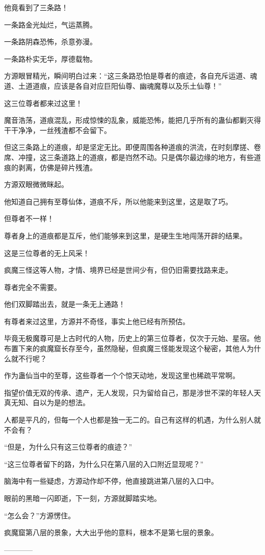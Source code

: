 \begin{this_body}
他竟看到了三条路！

一条路金光灿烂，气运蒸腾。

一条路阴森恐怖，杀意弥漫。

一条路朴实无华，厚德载物。

方源眼冒精光，瞬间明白过来：“这三条路恐怕是尊者的痕迹，各自充斥运道、魂道、土道道痕，应该是各自对应巨阳仙尊、幽魂魔尊以及乐土仙尊！”

这三位尊者都来过这里！

魔音浩荡，道痕混乱，形成惊悚的乱象，威能恐怖，能把几乎所有的蛊仙都剿灭得干干净净，一丝残渣都不会留下。

但这三条路上的道痕，却是坚定无比。即便周围各种道痕的洪流，在时刻摩搓、卷席、冲撞，这三条道路上的道痕，都是岿然不动。只是偶尔最边缘的地方，有些道痕的剥离，仿佛是碎片残渣。

方源双眼微微眯起。

他知道自己拥有至尊仙体，道痕不斥，所以他能来到这里，这是取了巧。

但尊者不一样！

尊者身上的道痕都是互斥，他们能够来到这里，是硬生生地闯荡开辟的结果。

这是三位尊者的无上风采！

疯魔三怪这等人物，才情、境界已经是世间少有，但仍旧需要找路来走。

尊者完全不需要。

他们双脚踏出去，就是一条无上通路！

有尊者来过这里，方源并不奇怪，事实上他已经有所预估。

毕竟无极魔尊可是上古时代的人物，历史上的第三位尊者，仅次于元始、星宿。他布置下来的疯魔窟长存至今，虽然隐秘，但疯魔三怪能发现这个秘密，其他人为什么就不行呢？

作为蛊仙当中的至尊，这些尊者一个个惊天动地，发现这里也稀疏平常啊。

指望价值无双的传承、遗产，无人发现，只为留给自己，那是涉世不深的年轻人天真无知、自以为是的想法。

人都是平凡的，但每一个人也都是独一无二的。自己有这样的机遇，为什么别人就不会有？

“但是，为什么只有这三位尊者的痕迹？”

“这三位尊者留下的路，为什么只在第八层的入口附近显现呢？”

脑海中有一些疑虑，方源动作却不停，他直接跳进第八层的入口中。

眼前的黑暗一闪即逝，下一刻，方源就脚踏实地。

“怎么会？”方源愣住。

疯魔窟第八层的景象，大大出乎他的意料，根本不是第七层的景象。

------------

\end{this_body}


